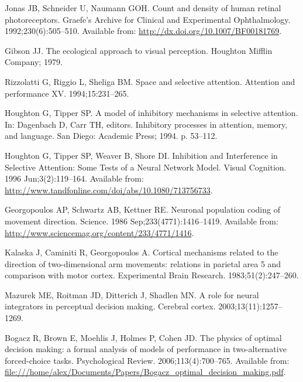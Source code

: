 \documentclass[10pt,letterpaper]{article}
\begin{document}
\begin{thebibliography}{10}
Jonas JB, Schneider U, Naumann GOH.
\newblock Count and density of human retinal photoreceptors.
\newblock Graefe's Archive for Clinical and Experimental Ophthalmology.
  1992;230(6):505--510.
\newblock Available from: \url{http://dx.doi.org/10.1007/BF00181769}.

Gibson JJ.
\newblock The ecological approach to visual perception.
\newblock Houghton Mifflin Company; 1979.

Rizzolatti G, Riggio L, Sheliga BM.
\newblock Space and selective attention.
\newblock Attention and performance XV. 1994;15:231--265.

Houghton G, Tipper SP.
\newblock A model of inhibitory mechanisms in selective attention.
\newblock In: Dagenbach D, Carr TH, editors. Inhibitory processes in attention,
  memory, and language. San Diego: Academic Press; 1994. p. 53--112.

Houghton G, Tipper SP, Weaver B, Shore DI.
\newblock Inhibition and {Interference} in {Selective} {Attention}: {Some}
  {Tests} of a {Neural} {Network} {Model}.
\newblock Visual Cognition. 1996 Jun;3(2):119--164.
\newblock Available from:
  \url{http://www.tandfonline.com/doi/abs/10.1080/713756733}.

Georgopoulos AP, Schwartz AB, Kettner RE.
\newblock Neuronal population coding of movement direction.
\newblock Science. 1986 Sep;233(4771):1416--1419.
\newblock Available from:
  \url{http://www.sciencemag.org/content/233/4771/1416}.

Kalaska J, Caminiti R, Georgopoulos A.
\newblock Cortical mechanisms related to the direction of two-dimensional arm
  movements: relations in parietal area 5 and comparison with motor cortex.
\newblock Experimental Brain Research. 1983;51(2):247--260.

Mazurek ME, Roitman JD, Ditterich J, Shadlen MN.
\newblock A role for neural integrators in perceptual decision making.
\newblock Cerebral cortex. 2003;13(11):1257--1269.

Bogacz R, Brown E, Moehlis J, Holmes P, Cohen JD.
\newblock The physics of optimal decision making: a formal analysis of models
  of performance in two-alternative forced-choice tasks.
\newblock Psychological Review. 2006;113(4):700--765.
\newblock Available from:
  \url{file:///home/alex/Documents/Papers/Bogacz_optimal_decision_making.pdf}.


\end{thebibliography}
\end{document}
